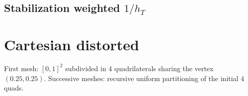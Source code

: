\documentclass[10pt]{article}
\begin{document}
  \begin{figure}[ht]
    \centering
      \scalebox{0.7}{}%
      \scalebox{0.7}{}
      \scalebox{0.7}{}%
      \scalebox{0.7}{}
      \scalebox{0.7}{}%
      \scalebox{0.7}{}
  \end{figure}

\FloatBarrier
\subsection{Stabilization weighted $1/h_T$}
  \begin{figure}[ht]
    \centering
      \scalebox{0.7}{}%
      \scalebox{0.7}{}
      \scalebox{0.7}{}%
      \scalebox{0.7}{}
  \end{figure}

  \begin{figure}[ht]
    \centering
      \scalebox{0.7}{}%
      \scalebox{0.7}{}
      \scalebox{0.7}{}%
      \scalebox{0.7}{}
      \scalebox{0.7}{}%
      \scalebox{0.7}{}
  \end{figure}

  \begin{figure}[ht]
    \centering
      \scalebox{0.7}{}%
      \scalebox{0.7}{}
      \scalebox{0.7}{}%
      \scalebox{0.7}{}
      \scalebox{0.7}{}%
      \scalebox{0.7}{}
  \end{figure}
\FloatBarrier

\section{Cartesian distorted}
    First mesh: $[0,1]^2$ subdivided in 4 quadrilaterals sharing the vertex $(0.25, 0.25)$. Successive meshes: recursive uniform partitioning of the initial 4 quads.
  \begin{figure}[ht]
    \centering
      \scalebox{0.7}{}%
      \scalebox{0.7}{}
      \scalebox{0.7}{}%
      \scalebox{0.7}{}
  \end{figure}
\end{document}
